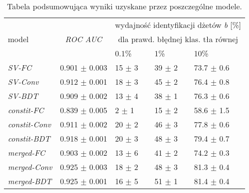 \begin{table}[ht]
\centering
\begin{tabular}{lcp{1.8cm}p{1.8cm}p{1.8cm}}
\toprule
                      &                   & \multicolumn{3}{c}{wydajność identyfikacji dżetów \textit{b} [\%]}    \\
model                 & \textit{ROC AUC}  & \multicolumn{3}{c}{dla prawd. błędnej klas. tła równej} \\
                      & \hspace{9em}                  & \hspace{0.5em} 0.1\%             & \hspace{0.5em} 1\%              & \hspace{0.5em} 10\%             \\
\midrule                      
\textit{SV-FC}        & 0.901 $\pm$ 0.003 & 15 $\pm$ 3        & 39 $\pm$ 2       & 73.7 $\pm$ 0.6       \\
\textit{SV-Conv}      & 0.912 $\pm$ 0.001 & 18 $\pm$ 3        & 45 $\pm$ 2       & 76.4 $\pm$ 0.8       \\
\vspace{5pt}
\textit{SV-BDT}       & 0.909 $\pm$ 0.002 & 13 $\pm$ 4        & 38 $\pm$ 1       & 76.3 $\pm$ 0.6       \\
\textit{constit-FC}   & 0.839 $\pm$ 0.005 & \hspace{0.5em}2 $\pm$ 1         & 15 $\pm$ 2       & 58.6 $\pm$ 1.5       \\
\textit{constit-Conv} & 0.911 $\pm$ 0.002 & 20 $\pm$ 2        & 46 $\pm$ 3       & 77.8 $\pm$ 0.6       \\
\vspace{5pt}
\textit{constit-BDT}  & 0.918 $\pm$ 0.001 & 20 $\pm$ 3        & 48 $\pm$ 3       & 79.4 $\pm$ 0.7       \\
\textit{merged-FC}    & 0.903 $\pm$ 0.002 & 13 $\pm$ 6        & 41 $\pm$ 2       & 74.2 $\pm$ 0.3       \\
\textit{merged-Conv}  & 0.925 $\pm$ 0.003 & 18 $\pm$ 2        & 48 $\pm$ 3       & 81.3 $\pm$ 0.4       \\
\textit{merged-BDT}   & 0.925 $\pm$ 0.001 & 16 $\pm$ 5        & 51 $\pm$ 1       & 81.4 $\pm$ 0.4		\\
\bottomrule  
\end{tabular}
\caption{Tabela podsumowująca wyniki uzyskane przez poszczególne modele.}
\label{tab:wyniki-modeli}
\end{table}


\FloatBarrier
